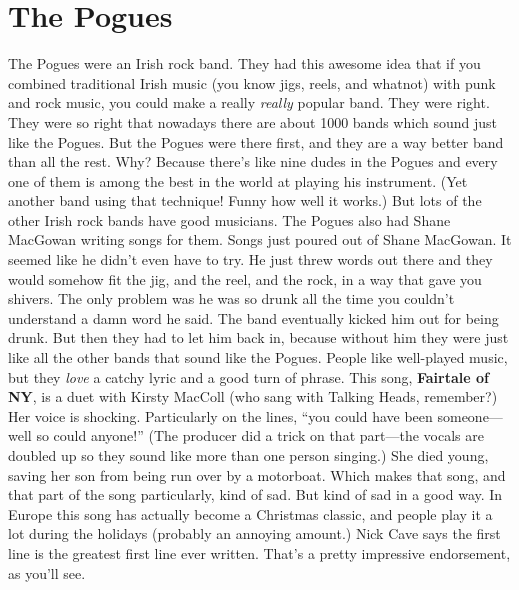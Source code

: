 \documentclass[letterpaper,single]{article}
\begin{document}
\section{The Pogues}
The Pogues were an Irish rock band. They had this awesome idea that if
you combined traditional Irish music (you know jigs, reels, and whatnot)
with punk and rock music, you could make a really \emph{really} popular
band. They were right. They were so right that nowadays there are about
1000 bands which sound just like the Pogues. But the Pogues were there
first, and they are a way better band than all the rest. Why? Because
there's like nine dudes in the Pogues and every one of them is among the
best in the world at playing his instrument. (Yet another band using
that technique! Funny how well it works.) But lots of the other Irish
rock bands have good musicians. The Pogues also had Shane MacGowan
writing songs for them. Songs just poured out of Shane MacGowan. It
seemed like he didn't even have to try. He just threw words out there
and they would somehow fit the jig, and the reel, and the rock, in a
way that gave you shivers. The only problem was he was so drunk all the
time you couldn't understand a damn word he said. The band eventually
kicked him out for being drunk. But then they had to let him back in,
because without him they were just like all the other bands that sound
like the Pogues. People like well-played music, but they \emph{love}
a catchy lyric and a good turn of phrase. This song, \textbf{Fairtale
of NY}, is a duet with Kirsty MacColl (who sang with Talking Heads,
remember?) Her voice is shocking. Particularly on the lines, ``you
could have been someone---well so could anyone!'' (The producer did a
trick on that part---the vocals are doubled up so they sound like more
than one person singing.) She died young, saving her son from being run
over by a motorboat. Which makes that song, and that part of the song
particularly, kind of sad. But kind of sad in a good way. In Europe
this song has actually become a Christmas classic, and people play it a
lot during the holidays (probably an annoying amount.) Nick Cave says
the first line is the greatest first line ever written. That's a pretty
impressive endorsement, as you'll see.
\end{document}
